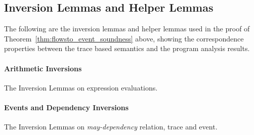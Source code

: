 \subsection{Inversion Lemmas and Helper Lemmas}
The following are the inversion lemmas and helper lemmas used in the proof of Theorem~\ref{thm:flowsto_event_soundness} above,
showing the correspondence properties between the trace based semantics and the program analysis results.
\paragraph*{Arithmetic Inversions}
The Inversion Lemmas on expression evaluations.

\paragraph*{Events and Dependency Inversions}
The Inversion Lemmas on \emph{may-dependency} relation, trace and event.

